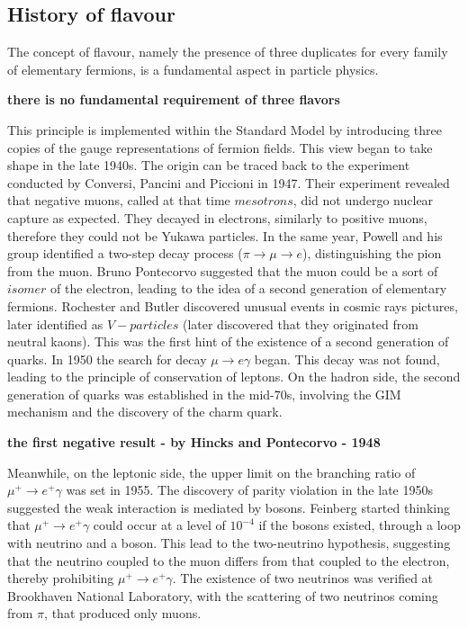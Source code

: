 \subsection{History of flavour}
The concept of flavour, namely the presence of three 
duplicates for every family of elementary fermions, is a fundamental aspect in particle physics.

{\bf \violet there is no fundamental requirement of three flavors}

This principle is implemented within the Standard Model by introducing 
three copies of the gauge representations of fermion fields. This view began 
to take shape in the late 1940s. The origin can be traced back to the 
experiment conducted by Conversi, Pancini and Piccioni in 1947. Their experiment 
revealed that negative muons, called at that time $mesotrons$, did not 
undergo nuclear capture as expected. They decayed in electrons, similarly to positive muons, 
therefore they could not be Yukawa particles. In the same year, 
Powell and his group identified a two-step decay process ($\pi \rightarrow \mu \rightarrow e$), 
distinguishing the pion from the muon. Bruno Pontecorvo suggested 
that the muon could be a sort of $isomer$ of the electron, leading to the idea of a second 
generation of elementary fermions. Rochester and Butler discovered 
unusual events in cosmic rays pictures, later identified as 
$V-particles$ (later 
discovered that they originated from neutral kaons). This was 
the first hint of the existence of a second generation of quarks. 
In 1950 the search 
for decay $\mu \rightarrow e \gamma$ began. This decay was not found, 
leading to the principle of conservation of leptons. On the hadron side, 
the second generation of quarks was established in the mid-70s, 
involving the GIM mechanism and the discovery of the charm quark.

{\bf \violet the first negative result - by Hincks and Pontecorvo - 1948}

Meanwhile, 
on the leptonic side, the upper limit on the branching ratio of $\mu^+ \rightarrow  e^+ \gamma$ was set in 1955. The discovery of parity violation 
in the late 1950s suggested the weak interaction is mediated by bosons. Feinberg started thinking that $\mu^+ \rightarrow  e^+ \gamma$ could occur 
at a level of $10^{-4}$ if the bosons existed, through a loop with neutrino and a boson. This lead to the two-neutrino hypothesis, suggesting that 
the neutrino coupled to the muon differs from that coupled to the electron, thereby prohibiting $\mu^+ \rightarrow  e^+ \gamma$. The existence of 
two neutrinos was verified at Brookhaven National Laboratory, with the {\violet scattering of two neutrinos coming from $\pi$,} that produced only muons.

